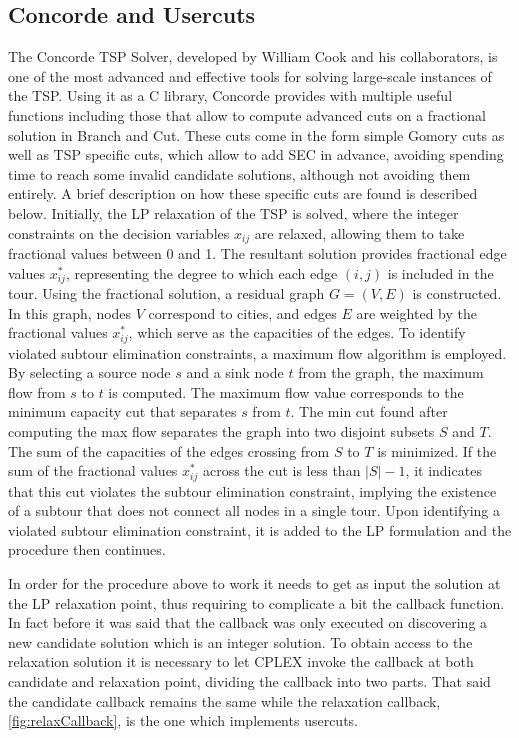 \subsection{Concorde and  Usercuts}

The Concorde TSP Solver, developed by William Cook and his collaborators, is one of the most advanced and effective tools for solving large-scale instances of the TSP.
Using it as a C library, Concorde provides with multiple useful functions including those that allow to compute advanced cuts on a fractional solution in Branch and Cut.
These cuts come in the form simple Gomory cuts as well as TSP specific cuts, which allow to add SEC in advance, avoiding spending time to reach some invalid candidate solutions, although not avoiding them entirely.
A brief description on how these specific cuts are found is described below.
Initially, the LP relaxation of the TSP is solved, where the integer constraints on the decision variables \( x_{ij} \) are relaxed, allowing them to take fractional values between 0 and 1.
The resultant solution provides fractional edge values \( x_{ij}^* \), representing the degree to which each edge \( (i,j) \) is included in the tour.
Using the fractional solution, a residual graph \( G = (V, E) \) is constructed.
In this graph, nodes \( V \) correspond to cities, and edges \( E \) are weighted by the fractional values \( x_{ij}^* \), which serve as the capacities of the edges.
To identify violated subtour elimination constraints, a maximum flow algorithm is employed.
By selecting a source node \( s \) and a sink node \( t \) from the graph, the maximum flow from \( s \) to \( t \) is computed.
The maximum flow value corresponds to the minimum capacity cut that separates \( s \) from \( t \).
The min cut found after computing the max flow separates the graph into two disjoint subsets \( S \) and \( T \).
The sum of the capacities of the edges crossing from \( S \) to \( T \) is minimized.
If the sum of the fractional values \( x_{ij}^* \) across the cut is less than \( |S| - 1 \), it indicates that this cut violates the subtour elimination constraint, implying the existence of a subtour that does not connect all nodes in a single tour.
Upon identifying a violated subtour elimination constraint, it is added to the LP formulation and the procedure then continues.

In order for the procedure above to work it needs to get as input the solution at the LP relaxation point, thus requiring to complicate a bit the callback function.
In fact before it was said that the callback was only executed on discovering a new candidate solution which is an integer solution.
To obtain access to the relaxation solution it is necessary to let CPLEX invoke the callback at both candidate and relaxation point, dividing the callback into two parts.
That said the candidate callback remains the same while the relaxation callback, \figurename{ \ref{fig:relaxCallback}}, is the one which implements usercuts.

